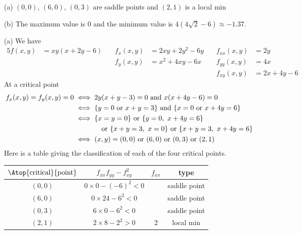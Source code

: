 %

\begin{answer}
(a) $(0,0)$, $(6,0)$, $(0,3)$ are saddle points and $(2,1)$ is a local min

(b) The maximum value is $0$ and the minimum value is $4(4\sqrt{2}-6)
\approx -1.37$.
\end{answer}

\begin{solution}
(a) We have
\begin{alignat*}{5}
f(x,y)&=xy(x+2y-6)\quad &
     f_x(x,y)&=2xy+2y^2-6y\quad &
     f_{xx}(x,y)&=2y \\
 & & f_y(x,y)&=x^2+4xy-6x &
     f_{yy}(x,y)&=4x\\
 & & & &f_{xy}(x,y)&=2x+4y-6
\end{alignat*}
At a critical point
\begin{align*}
f_x(x,y)=f_y(x,y)=0
&\iff 2y(x+y-3)=0\text{ and }x(x+4y-6)=0 \\
&\iff \{y=0\text{ or }x+y=3\}\text{ and }\{x=0\text{ or }x+4y=6\}\\
&\iff \{x=y=0\}\text{ or }\{y=0,\ x+4y=6\}\\
&\hskip0.5in\text{ or }\{x+y=3,\ x=0\}
                   \text{ or }\{x+y=3,\ x+4y=6\}\\
&\iff (x,y)=(0,0)\text{ or }(6,0)\text{ or }(0,3)\text{ or }(2,1)
\end{align*}
Here is a table giving the classification of each of the four critical
points.
\begin{center}
\renewcommand{\arraystretch}{1.3}
     \begin{tabular}{|c|c|c|c|}
     \hline
    $\Atop{\text{critical}}{\text{point}}$  & $f_{xx}f_{yy}-f_{xy}^2$ & 
                                                          $f_{xx}$ & type \\    
    \hline
     $(0,0)$   & $0\times 0-(-6)^2<0$   &    &saddle point \\ \hline
     $(6,0)$   & $0\times 24-6^2<0$     &    &saddle point \\  \hline
     $(0,3)$   & $6\times 0-6^2<0$      &    &saddle point \\  \hline
     $(2,1)$   & $2\times 8-2^2>0$      & 2  &local min \\  \hline
     \end{tabular}
\renewcommand{\arraystretch}{1.0}
\end{center}


\end{solution}

